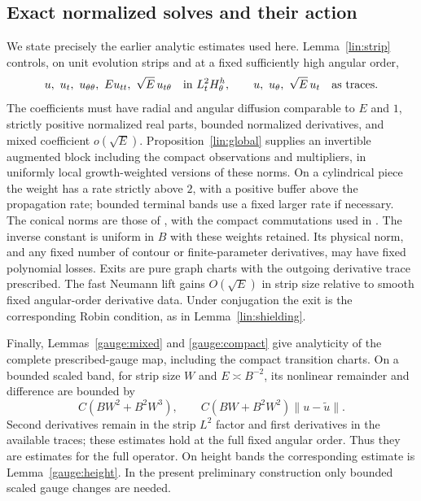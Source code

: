 \subsection{Exact normalized solves and their action}

We state precisely the earlier analytic estimates used here.
Lemma~\ref{lin:strip} controls, on unit evolution strips and at a
fixed sufficiently high angular order,
\[
 u,\ u_t,\ u_{\theta\theta},\ E u_{tt},\ \sqrt E\,u_{t\theta}
 \quad\hbox{in }L^2_tH^h_\theta,
 \qquad u,\ u_\theta,\ \sqrt E\,u_t\quad\hbox{as traces}.
\]
The coefficients must have radial and angular diffusion comparable
to \(E\) and \(1\), strictly positive normalized real parts, bounded
normalized derivatives, and mixed coefficient \(o(\sqrt E)\).
Proposition~\ref{lin:global} supplies an invertible augmented block
including the compact observations and multipliers, in uniformly
local growth-weighted versions of these norms.  On a cylindrical
piece the weight has a rate strictly above \(2\), with a positive
buffer above the propagation rate; bounded terminal bands use a
fixed larger rate if necessary.  The conical norms are those of
, with the compact commutations used in
.  The inverse constant is
uniform in \(B\) with these weights retained.  Its physical norm,
and any fixed number of contour or finite-parameter derivatives,
may have fixed polynomial losses.  Exits are pure graph charts
with the outgoing derivative trace prescribed.  The fast Neumann
lift gains \(O(\sqrt E)\) in strip size relative to smooth fixed
angular-order derivative data.  Under conjugation the exit is the
corresponding Robin condition, as in Lemma~\ref{lin:shielding}.

Finally, Lemmas~\ref{gauge:mixed} and \ref{gauge:compact}
give analyticity of the complete prescribed-gauge map,
including the compact transition charts.
On a bounded scaled band, for strip size \(W\) and \(E\asymp B^{-2}\),
its nonlinear remainder and difference are bounded by
\begin{equation}\label{arr:tame-interface}
 C(BW^2+B^2W^3),\qquad
 C(BW+B^2W^2)\|u-\widetilde u\|.
\end{equation}
Second derivatives remain in the strip \(L^2\) factor and first
derivatives in the available traces; these estimates hold at the
full fixed angular order.  Thus they are estimates for the full
operator.  On height bands the corresponding estimate is
Lemma~\ref{gauge:height}.  In the present preliminary construction
only bounded scaled gauge changes are needed.

